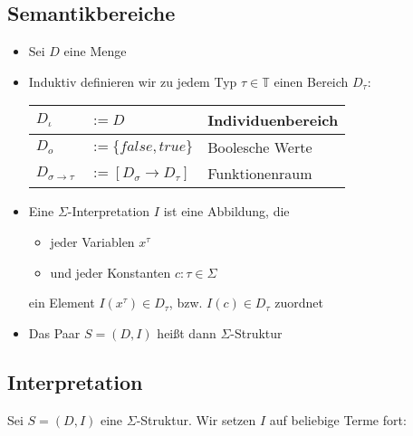 \documentclass{scrartcl}
\begin{document}
\pagebreak
\subsection{Semantikbereiche}

\begin{itemize}
	\item Sei $ D $ eine Menge
	\item Induktiv definieren wir zu jedem Typ $ \tau \in \mathbb{T} $ einen Bereich $ D_\tau $: \\
	\begin{tabular}{ll|l}
		$ D_\iota $ & $ := D $ & Individuenbereich \\ 
		\hline 
		$ D_o $ & $ := \{ false, true \} $ & Boolesche Werte  \\ 
		\hline 
		$ D_{\sigma \rightarrow \tau} $ & $ := [D_\sigma \rightarrow D_\tau] $ & Funktionenraum \\ 
	\end{tabular} 
	\item Eine $ \Sigma $-Interpretation $ I $ ist eine Abbildung, die
	\begin{itemize}
		\item jeder Variablen $ x^\tau $
		\item und jeder Konstanten $ c : \tau \in \Sigma $
	\end{itemize}
	ein Element $ I(x^\tau) \in D_\tau $, bzw. $ I(c) \in D_\tau $ zuordnet
	\item Das Paar $ S = (D,I) $ heißt dann $ \Sigma $-Struktur
\end{itemize}

\subsection{Interpretation}

Sei $ S = (D,I) $ eine $ \Sigma $-Struktur. Wir setzen $ I $ auf beliebige Terme fort: \\
\end{document}
